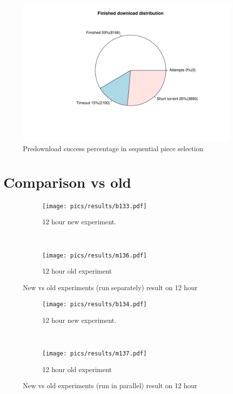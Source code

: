 \begin{figure}[h]
	\centering
	\includegraphics[width=\textwidth]{pics/results/dpredown_sequential.pdf}
	\caption{Predownload success percentage in sequential piece selection}
	\label{fig:predownpseq}
\end{figure}
\clearpage
\section{Comparison vs old}
\begin{figure}[h]
	\begin{adjustwidth}{-2.5cm}{}
		\begin{subfigure}[t]{0.7\textwidth}
			\centering
			\texttt{[image: pics/results/b133.pdf]}
			\caption{12 hour new experiment.}
		\end{subfigure}
		~
		\begin{subfigure}[t]{0.7\textwidth}
			\centering
			\texttt{[image: pics/results/m136.pdf]}
			\caption{12 hour old experiment}
		\end{subfigure}
		\caption{New vs old experiments (run separately) result on 12 hour}
	\end{adjustwidth}
\end{figure}

\begin{figure}[h]
		\begin{adjustwidth}{-2.5cm}{}
	\begin{subfigure}[t]{0.7\textwidth}
		\centering
		\texttt{[image: pics/results/b134.pdf]}
		\caption{12 hour new experiment.}
	\end{subfigure}
	~
	\begin{subfigure}[t]{0.7\textwidth}
		\centering
		\texttt{[image: pics/results/m137.pdf]}
		\caption{12 hour old experiment}
	\end{subfigure}
	\caption{New vs old experiments (run in parallel) result on 12 hour}
		\end{adjustwidth}
\end{figure}

